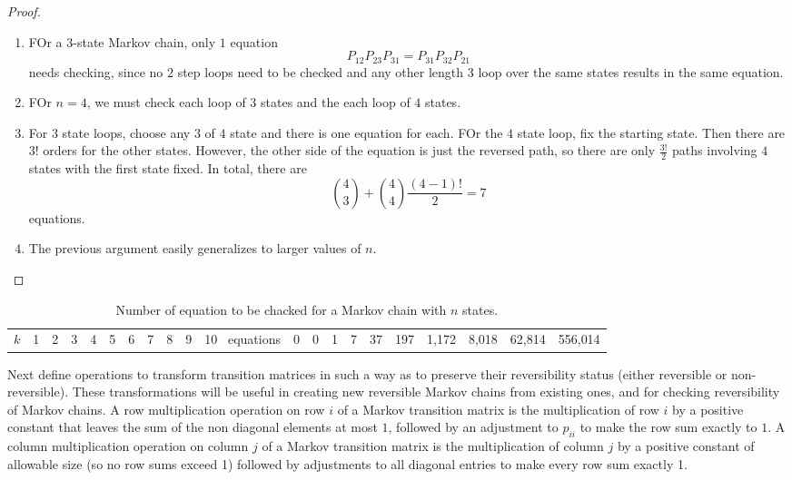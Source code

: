 \documentclass[12pt]{article}
\begin{document}
\begin{proof}
  \begin{enumerate}
  \item FOr a $3$-state Markov chain, only $1$ equation
    \[
      P_{12}P_{23}P_{31} = P_{31} P_{32} P_{21}
    \]
    needs checking, since no $2$ step loops need to be checked and any
    other length $3$ loop over the same states results in the same
    equation.
  \item FOr $n=4$, we must check each loop of $3$ states and the each
    loop of $4$ states.
  \item For $3$ state loops, choose any $3$ of $4$ state and there is
    one equation for each.  FOr the $4$ state loop, fix the starting
    state.  Then there are $3!$ orders for the other states.  However,
     the other side of the equation is just the reversed path, so
     there are only $\frac{3!}{2}$ paths involving $4$ states with the
     first state fixed.  In total, there are
     \[
       \binom{4}{3} + \binom{4}{4} \frac{(4-1)!}{2} = 7
     \]
     equations.
   \item The previous argument easily generalizes to larger values of $n$.
  \end{enumerate}
\end{proof}

\begin{table}
  \centering
  \begin{tabular}{ccccccccccc}
    $k$& 1&2 &3 &4 &5 &6 & 7 & 8 & 9 & 10 \
    equations & 0 & 0 & 1 & 7 & 37 & 197 & 1{,}172 & 8{,}018 & 62{,}814 & 556{,}014
  \end{tabular}
  \caption{Number of equation to be chacked for a Markov chain with
    $n$ states.}
  \label{tab:reversiblemarkovchains:loopeqns}
\end{table}

Next define operations to transform transition matrices in such a way as to
preserve their reversibility status (either reversible or
non-reversible). These
transformations will be useful in creating new reversible Markov chains from existing
ones, and for checking reversibility of Markov chains.
A row multiplication operation on row $i$ of a Markov transition
matrix is the multiplication of row $i$ by a positive constant that leaves the sum
of the non diagonal elements at most $1$, followed by an adjustment to $p_{ii}$ to make
the row sum exactly to $1$.
A column multiplication operation on column $j$ of a Markov transition matrix is the multiplication of column $j$ by a positive constant of allowable
size (so no row sums exceed 1) followed by adjustments to all diagonal entries to
make every row sum exactly 1.
\end{document}
